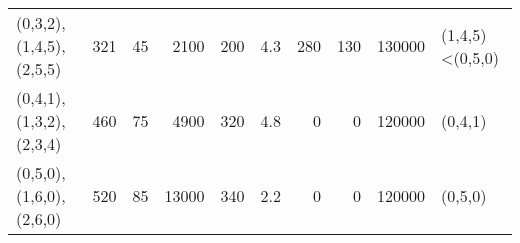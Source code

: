 \begin{tabular}{lrrrrrrrrl}
 (0,3,2),(1,4,5),(2,5,5) &        321 &                                45 &                      2100       &                               200 &                           4.3   &                               280 &                             130 &     130000 & (1,4,5)<(0,5,0)         \\
 (0,4,1),(1,3,2),(2,3,4) &        460 &                                75 &                      4900       &                               320 &                           4.8   &                                 0 &                               0 &     120000 & (0,4,1)                 \\
 (0,5,0),(1,6,0),(2,6,0) &        520 &                                85 &                     13000       &                               340 &                           2.2   &                                 0 &                               0 &     120000 & (0,5,0)                 \\
\hline
\end{tabular}